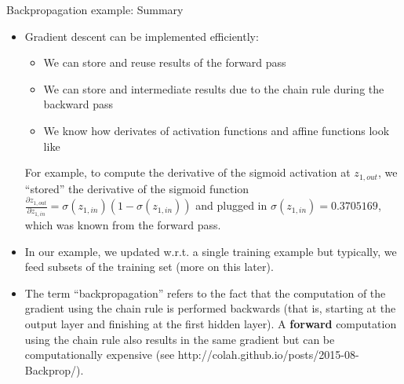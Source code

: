 \begin{vbframe} {Backpropagation example: Summary}

  \begin{itemize}
    \item Gradient descent can be implemented efficiently: 
    \begin{itemize}
      \item We can store and reuse results of the forward pass
      \item We can store and intermediate results due to the chain rule during the backward pass  
      \item We know how derivates of activation functions and affine functions look like
    \end{itemize}
    For example, to compute the derivative of the sigmoid activation at $z_{1,out}$, we \enquote{stored} the derivative of the sigmoid function $\frac{\partial z_{1,out}}{\partial z_{1,in}} = \sigma(z_{1,in})(1-\sigma(z_{1,in}))$ and plugged in $\sigma(z_{1,in}) = \num[round-mode=places,round-precision=4]{0.3705169}$, which was known from the forward pass.
\end{itemize}
\framebreak  

  \begin{itemize}
  \item In our example, we updated w.r.t. a single training example but typically, we feed subsets of the training set (more on this later).
    \item The term \enquote{backpropagation} refers to the fact that the computation of the gradient using the chain rule is performed backwards (that is, starting at the output layer and finishing at the first hidden layer). 
      A \textbf{forward} computation using the chain rule also results in the same gradient but can be computationally expensive (see http://colah.github.io/posts/2015-08-Backprop/).
 \end{itemize}
\end{vbframe} 

